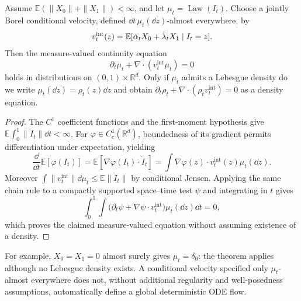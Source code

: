 \documentclass[12pt,a4paper,oneside]{book}
\begin{document}
\begin{theorem}
\label{thm:interpolant}
\label{src:p14q2}
Assume $\mathbb E(\|X_0\|+\|X_1\|)<\infty$, and let
$\mu_t=\operatorname{Law}(I_t)$. Choose a jointly Borel conditional
velocity, defined $\dd t\,\mu_t(\dd z)$-almost everywhere, by
\begin{equation}
 v_t^{\mathrm{int}}(z)=\mathbb{E}[\dot\alpha_tX_0+\dot\lambda_tX_1\mid I_t=z].
\label{eq:interpolantvelocity}
\end{equation}
Then the measure-valued continuity equation
\begin{equation*}
\partial_t\mu_t+\nabla\cdot(v_t^{\mathrm{int}}\mu_t)=0
\end{equation*}
holds in distributions on $(0,1)\times\mathbb R^d$.
Only if $\mu_t$ admits a Lebesgue density do we write
$\mu_t(\dd z)=\rho_t(z)\dd z$ and obtain
$\partial_t\rho_t+\nabla\cdot(\rho_tv_t^{\mathrm{int}})=0$ as a density equation.
\end{theorem}
\begin{proof}
The $C^1$ coefficient functions and the first-moment hypothesis give
$\mathbb E\int_0^1\|\dot I_t\|\dd t<\infty$.
For $\varphi\in C_c^1(\mathbb R^d)$, boundedness of its gradient
permits differentiation under expectation, yielding
\begin{equation*}
\frac{\dd}{\dd t}\mathbb E[\varphi(I_t)]
 =\mathbb E[\nabla\varphi(I_t)\cdot\dot I_t]
 =\int\nabla\varphi(z)\cdot v_t^{\mathrm{int}}(z)\mu_t(\dd z).
\end{equation*}
Moreover $\int\|v_t^{\mathrm{int}}\|\dd\mu_t\le\mathbb E\|\dot I_t\|$ by conditional
Jensen. Applying the same chain rule to a compactly supported
space--time test $\psi$ and integrating in $t$ gives
\begin{equation*}
\int_0^1\int\bigl(\partial_t\psi+\nabla\psi\cdot v_t^{\mathrm{int}}\bigr)
                   \mu_t(\dd z)\dd t=0,
\end{equation*}
which proves the claimed measure-valued equation without assuming
existence of a density.
\end{proof}
For example, $X_0=X_1=0$ almost surely gives $\mu_t=\delta_0$:
the theorem applies although no Lebesgue density exists.
A conditional velocity specified only $\mu_t$-almost everywhere does
not, without additional regularity and well-posedness assumptions,
automatically define a global deterministic ODE flow.
\end{document}
